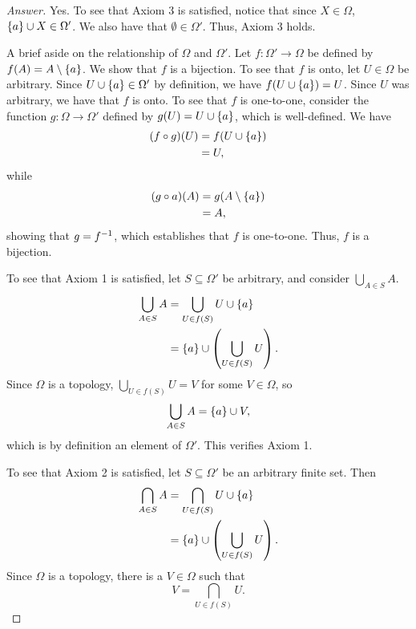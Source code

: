 \begin{proof}[Answer]
    Yes. To see that Axiom 3 is satisfied, notice that since $X \in \Omega$,
    $\{a\} \cup X \in \Omega'$. We also have that $\emptyset \in \Omega'$.
    Thus, Axiom 3 holds.

    A brief aside on the relationship of $\Omega$ and $\Omega'$. Let $f :
    \Omega' \to \Omega$ be defined by $f(A) = A \setminus \{a\}$. We show that
    $f$ is a bijection. To see that $f$ is onto, let $U \in \Omega$ be
    arbitrary. Since $U \cup \{a\} \in \Omega'$ by definition, we have $f(U
    \cup \{a\}) = U$. Since $U$ was arbitrary, we have that $f$ is onto. To
    see that $f$ is one-to-one, consider the function $g : \Omega \to \Omega'$
    defined by $g(U) = U \cup \{a\}$, which is well-defined. We have
    \begin{align*}
        (f \circ g)(U) &= f(U\cup \{a\}) \\
                       &= U,
    \end{align*}
    while
    \begin{align*}
        (g \circ a)(A) &= g(A \setminus \{a\}) \\
                       &= A,
    \end{align*}
    showing that $g = f^{-1}$, which establishes that $f$ is one-to-one. Thus,
    $f$ is a bijection.

    To see that Axiom 1 is satisfied, let $S \subseteq \Omega'$ be arbitrary,
    and consider $\bigcup_{A \in S} A$.     
    \begin{align*}
        \bigcup_{A \in S} A &= \bigcup_{U \in f(S)} U \cup \{a\} \\
                            &= \{a\} \cup \left( \bigcup_{U \in f(S)} U
                            \right). 
    \end{align*}
    Since $\Omega$ is a topology, $\bigcup_{U \in f(S)} U = V$ for some $V \in
    \Omega$, so
    \[
        \bigcup_{A \in S} A = \{a\} \cup V,
    \]
    which is by definition an element of $\Omega'$. This verifies Axiom 1.

    To see that Axiom 2 is satisfied, let $S \subseteq \Omega'$ be an arbitrary
    finite set. Then
    \begin{align*}
        \bigcap_{A \in S} A &= \bigcap_{U \in f(S)} U \cup \{a\} \\
        &= \{a\} \cup \left( \bigcup_{U \in f(S)} U \right).
    \end{align*}
    Since $\Omega$ is a topology, there is a $V \in \Omega$ such that
    \[
        V = \bigcap_{U \in f(S)} U.
    \]
  \end{proof}

